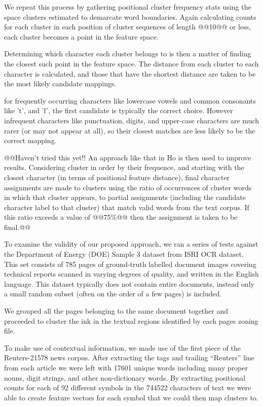 \documentclass[times, 10pt,twocolumn]{article}
\begin{document}
We repeat this process by gathering positional cluster frequency stats using
the space clusters estimated to demarcate word boundaries.  Again calculating
counts for each cluster in each position of cluster sequences of length @@10@@
or less, each cluster becomes a point in the feature space.

Determining which character each cluster belongs to is then a matter of
finding the closest such point in the feature space.  The distance from each
cluster to each character is calculated, and those that have the shortest
distance are taken to be the most likely candidate mappings.

for frequently occurring characters like lowercase vowels and common consonants
like 't', and 'f', the first candidate is typically the correct choice.
However infrequent characters like punctuation, digits, and upper-case
characters are much rarer (or may not appear at all), so their closest matches
are less likely to be the correct mapping.

@@Haven't tried this yet!!
An approach like that in Ho\cite{ho2000} is then used to improve results.
Considering cluster in order by their frequence, and starting with the closest 
character (in terms of positional feature distance), final character 
assignments are made to clusters using the ratio of occurrences of cluster 
words in which that cluster appears, to partial assignments (including the 
candidate character label to that cluster) that match valid words from the text 
corpus.  If this ratio exceeds a value of @@75\%@@ then the assignment is taken
to be final.@@



To examine the validity of our proposed approach, we ran a series of tests 
against the Department of Energy (DOE) Sample 3 dataset from ISRI OCR 
dataset\cite{nartker2005}.  This set consists of 785 pages of ground-truth
labelled document images covering technical reports scanned in varying degrees
of quality, and written in the English language.  This dataset typically does 
not contain entire documents, instead only a small random subset (often on the
order of a few pages) is included.

We grouped all the pages belonging to the same document together and proceeded
to cluster the ink in the textual regions identified by each pages zoning file.

To make use of contextual information, we made use of the first piece of the
Reuters-21578 news corpus\cite{lewis2004}.  After extracting the tags and
trailing ``Reuters'' line from each article we were left with 17601 unique
words including many proper nouns, digit strings, and other non-dictionary
words.  By extracting positional counts for each of 92 different symbols in the
744522 characters of text we were able to create feature vectors for each
symbol that we could then map clusters to.
\end{document}
